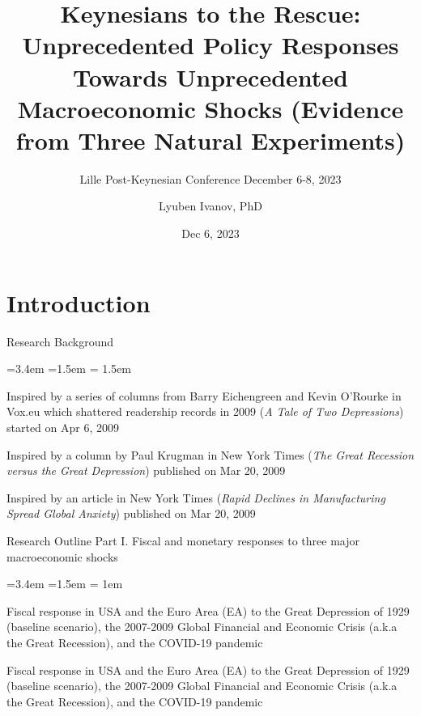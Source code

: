 \documentclass{beamer}
\title{Keynesians to the Rescue: Unprecedented Policy Responses Towards Unprecedented Macroeconomic Shocks (Evidence from Three Natural Experiments)}
\subtitle{Lille Post-Keynesian Conference 
\newline December 6-8, 2023 }
\date{Dec 6, 2023}
\author{Lyuben Ivanov, PhD}
\institute{Faculty of Economics and Business, Sofia University St. Kliment Ohridski}
\begin{document}
\maketitle

\section{Introduction}

\begin{frame}{Research Background}
\vfill
\begin{list}{\faChevronCircleRight}{\leftmargin=3.4em =1.5em 
\itemsep = 1.5em}
\item Inspired by a series of columns from Barry Eichengreen and Kevin O'Rourke in Vox.eu which shattered readership records in 2009 (\textit{A Tale of Two Depressions}) started on Apr 6, 2009
\item Inspired by a column by Paul Krugman in New York Times (\textit{The Great Recession versus the Great Depression}) published on Mar 20, 2009
\item Inspired by an article in New York Times (\textit{Rapid Declines in Manufacturing Spread Global Anxiety}) published on Mar 20, 2009
\end{list}
	
\end{frame}

\begin{frame}{Research Outline}
Part I. Fiscal and monetary responses to three major macroeconomic shocks
\begin{list}{\faChevronCircleRight}{\leftmargin=3.4em =1.5em 
\itemsep = 1em}
\item [\ding{202}] Fiscal response in USA and the Euro Area (EA) to the Great Depression of 1929 (baseline scenario), the 2007-2009 Global Financial and Economic Crisis (a.k.a the Great Recession), and the COVID-19 pandemic
\item [\ding{203}] Fiscal response in USA and the Euro Area (EA) to the Great Depression of 1929 (baseline scenario), the 2007-2009 Global Financial and Economic Crisis (a.k.a the Great Recession), and the COVID-19 pandemic
\end{list}
\end{frame}
\end{document}
